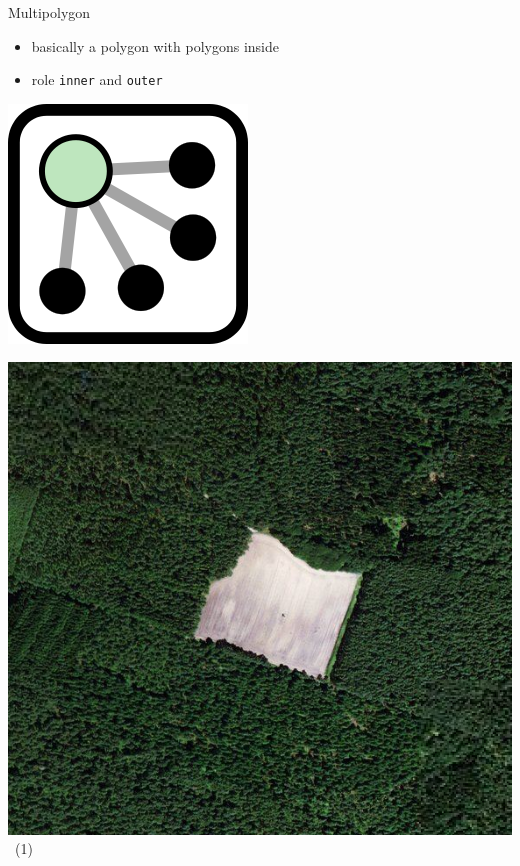 \documentclass{beamer}
\begin{document}
	\begin{frame}{Multipolygon}
		\begin{itemize}
			\item basically a polygon with polygons inside
			\item role \texttt{inner} and \texttt{outer}
		\end{itemize}
		
		\vfill
		
		\begin{center}
			\begin{minipage}[b][0.6\textheight][c]{0.2\linewidth}
				\centering
				\includegraphics[width=0.5\linewidth,height=0.5\textheight,keepaspectratio]{images/240px-Mf_Relation.png}
			\end{minipage}
			\begin{minipage}[b][0.6\textheight][c]{0.4\linewidth}
				\centering
				\includegraphics[width=0.8\linewidth,height=0.8\textheight,keepaspectratio]{images/multipolygon.png}~\tiny{(1)}

\end{minipage}
\end{center}
\end{frame}
\end{document}
